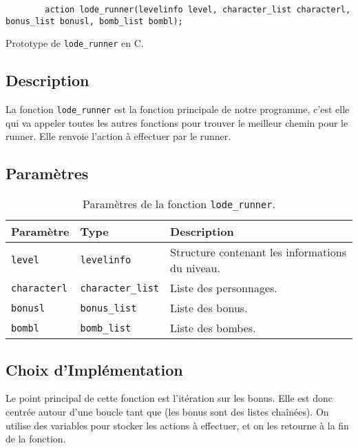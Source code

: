 \begin{listing}[!htpb]
    \begin{verbatim}
        action lode_runner(levelinfo level, character_list characterl, bonus_list bonusl, bomb_list bombl);
    \end{verbatim}
    \caption{Prototype de \texttt{lode\_runner} en C.}
    \label{listing:c-lode_runner-prototype}
\end{listing}

\subsection{Description}

La fonction \texttt{lode\_runner} est la fonction principale de notre programme, c'est elle qui va appeler toutes les autres fonctions pour trouver le meilleur chemin pour le runner.
Elle renvoie l'action à effectuer par le runner.

\subsection{Paramètres}

\begin{table}[!htpb]
    \begin{tabularx}{\textwidth}{lXX}
        \toprule
        \textbf{Paramètre} & \textbf{Type} & \textbf{Description} \\
        \midrule
        \texttt{level} & \texttt{levelinfo} & Structure contenant les informations du niveau. \\
        \texttt{characterl} & \texttt{character\_list} & Liste des personnages. \\
        \texttt{bonusl} & \texttt{bonus\_list} & Liste des bonus. \\
        \texttt{bombl} & \texttt{bomb\_list} & Liste des bombes. \\
        \bottomrule
    \end{tabularx}
    \caption{Paramètres de la fonction \texttt{lode\_runner}.}
    \label{tab:parameters-lode_runner}
\end{table}

\subsection{Choix d'Implémentation}

Le point principal de cette fonction est l'itération sur les bonus.
Elle est donc centrée autour d'une boucle tant que (les bonus sont des listes chaînées).
On utilise des variables pour stocker les actions à effectuer, et on les retourne à la fin de la fonction.

